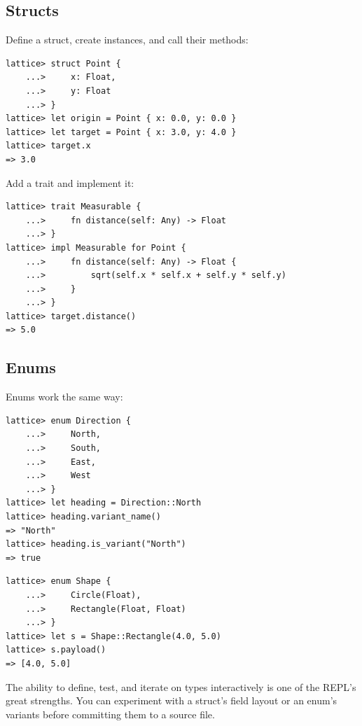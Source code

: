\subsection{Structs}\label{subsec:repl-structs}

Define a struct, create instances, and call their methods:

\begin{lstlisting}[language=Lattice, numbers=none]
lattice> struct Point {
    ...>     x: Float,
    ...>     y: Float
    ...> }
lattice> let origin = Point { x: 0.0, y: 0.0 }
lattice> let target = Point { x: 3.0, y: 4.0 }
lattice> target.x
=> 3.0
\end{lstlisting}

Add a trait and implement it:

\begin{lstlisting}[language=Lattice, numbers=none]
lattice> trait Measurable {
    ...>     fn distance(self: Any) -> Float
    ...> }
lattice> impl Measurable for Point {
    ...>     fn distance(self: Any) -> Float {
    ...>         sqrt(self.x * self.x + self.y * self.y)
    ...>     }
    ...> }
lattice> target.distance()
=> 5.0
\end{lstlisting}

\subsection{Enums}\label{subsec:repl-enums}

Enums work the same way:

\begin{lstlisting}[language=Lattice, numbers=none]
lattice> enum Direction {
    ...>     North,
    ...>     South,
    ...>     East,
    ...>     West
    ...> }
lattice> let heading = Direction::North
lattice> heading.variant_name()
=> "North"
lattice> heading.is_variant("North")
=> true
\end{lstlisting}

\begin{lstlisting}[language=Lattice, numbers=none]
lattice> enum Shape {
    ...>     Circle(Float),
    ...>     Rectangle(Float, Float)
    ...> }
lattice> let s = Shape::Rectangle(4.0, 5.0)
lattice> s.payload()
=> [4.0, 5.0]
\end{lstlisting}

The ability to define, test, and iterate on types interactively is one of the REPL's great strengths.
You can experiment with a struct's field layout or an enum's variants before committing them to a source file.

